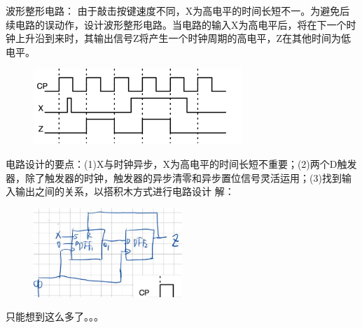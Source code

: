 \documentclass[a4paper,11pt,UTF8]{article}
\begin{document}
波形整形电路： 由于敲击按键速度不同，X为高电平的时间长短不一。为避免后续电路的误动作，设计波形整形电路。当电路的输入X为高电平后，将在下一个时钟上升沿到来时，其输出信号Z将产生一个时钟周期的高电平，Z在其他时间为低电平。
\begin{figure}[H]
	\centering
	\includegraphics[width=0.7\textwidth]{5_class}
\end{figure}
电路设计的要点：(1)X与时钟异步，X为高电平的时间长短不重要；(2)两个D触发器，除了触发器的时钟，触发器的异步清零和异步置位信号灵活运用；(3)找到输入输出之间的关系，以搭积木方式进行电路设计
\noindent 解：
\begin{figure}[H]
	\centering
	\includegraphics[width=0.5\textwidth]{5_class_1}
\end{figure}
只能想到这么多了。。。
\end{document}
